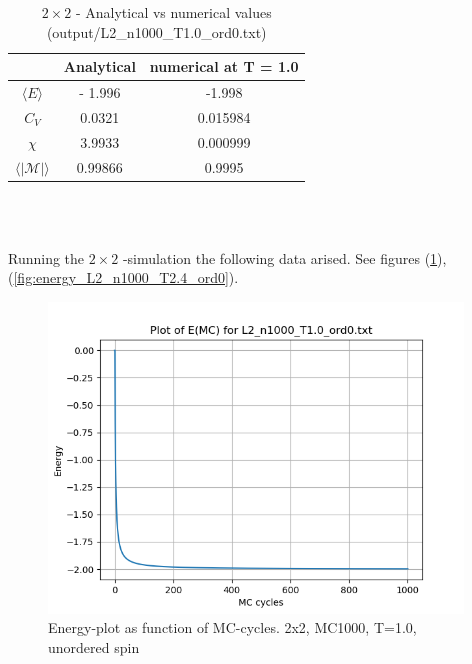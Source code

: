 \documentclass{article}
\begin{document}
  \begin{table}[ht]
    \centering
    \caption{\texorpdfstring{ $2 \times 2$ }{text} - Analytical vs numerical values (output/L2\_n1000\_T1.0\_ord0.txt)}
    \vspace{2mm}
    \label{tab:analyticalvsnumerical}
    \begin{tabular}{|c|c|c|}
        \hline
         & Analytical & numerical at T = 1.0\\
        \hline \hline
        $\langle E \rangle $ & - 1.996 & -1.998 \\
        $C_V$ & 0.0321 & 0.015984 \\
        $\chi$ & 3.9933 & 0.000999 \\
        $\langle | \mathcal{M} | \rangle $ & 0.99866 & 0.9995 \\
        \hline
    \end{tabular} \\
    \hspace{0pt}\\
  \end{table}

  Running the $2 \times 2$ -simulation the following data arised. See figures (\ref{fig:energy_L2_n1000_T1.0_ord0}), (\ref{fig:energy_L2_n1000_T2.4_ord0}).

  \begin{figure}[ht]
      \centering
      \includegraphics[width = 11cm]{img/energy_L2_n1000_T10_ord0.png}
      \caption{Energy-plot as function of MC-cycles. 2x2, MC1000, T=1.0, unordered spin}
      \label{fig:energy_L2_n1000_T1.0_ord0}
    \end{figure}
\end{document}
